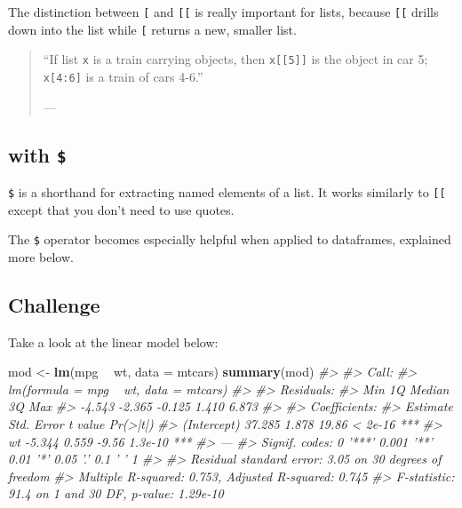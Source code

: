 \documentclass[]{book}
\newenvironment{Shaded}{\begin{snugshade}}{\end{snugshade}}
\newcommand{\CommentTok}[1]{\textcolor[rgb]{0.56,0.35,0.01}{\textit{#1}}}
\newcommand{\DataTypeTok}[1]{\textcolor[rgb]{0.13,0.29,0.53}{#1}}
\newcommand{\KeywordTok}[1]{\textcolor[rgb]{0.13,0.29,0.53}{\textbf{#1}}}
\newcommand{\NormalTok}[1]{#1}
\newcommand{\OperatorTok}[1]{\textcolor[rgb]{0.81,0.36,0.00}{\textbf{#1}}}
\newcommand{\StringTok}[1]{\textcolor[rgb]{0.31,0.60,0.02}{#1}}
\begin{document}
The distinction between \texttt{{[}} and \texttt{{[}{[}} is really important for lists, because \texttt{{[}{[}} drills down into the list while \texttt{{[}} returns a new, smaller list.

\begin{quote}
``If list \texttt{x} is a train carrying objects, then \texttt{x{[}{[}5{]}{]}} is
the object in car 5; \texttt{x{[}4:6{]}} is a train of cars 4-6.''

--- \citet{RLangTip}
\end{quote}

\hypertarget{with-2}{%
\subsection{\texorpdfstring{with \texttt{\$}}{with \$}}\label{with-2}}

\texttt{\$} is a shorthand for extracting named elements of a list. It works similarly to \texttt{{[}{[}} except that you don't need to use quotes.

\begin{Shaded}
\end{Shaded}

The \texttt{\$} operator becomes especially helpful when applied to dataframes, explained more below.

\hypertarget{challenge-2}{%
\subsection{Challenge}\label{challenge-2}}

Take a look at the linear model below:

\begin{Shaded}
\begin{Highlighting}[]
\NormalTok{mod <-}\StringTok{ }\KeywordTok{lm}\NormalTok{(mpg }\OperatorTok{~}\StringTok{ }\NormalTok{wt, }\DataTypeTok{data =}\NormalTok{ mtcars)}
\KeywordTok{summary}\NormalTok{(mod)}
\CommentTok{#> }
\CommentTok{#> Call:}
\CommentTok{#> lm(formula = mpg ~ wt, data = mtcars)}
\CommentTok{#> }
\CommentTok{#> Residuals:}
\CommentTok{#>    Min     1Q Median     3Q    Max }
\CommentTok{#> -4.543 -2.365 -0.125  1.410  6.873 }
\CommentTok{#> }
\CommentTok{#> Coefficients:}
\CommentTok{#>             Estimate Std. Error t value Pr(>|t|)    }
\CommentTok{#> (Intercept)   37.285      1.878   19.86  < 2e-16 ***}
\CommentTok{#> wt            -5.344      0.559   -9.56  1.3e-10 ***}
\CommentTok{#> ---}
\CommentTok{#> Signif. codes:  0 '***' 0.001 '**' 0.01 '*' 0.05 '.' 0.1 ' ' 1}
\CommentTok{#> }
\CommentTok{#> Residual standard error: 3.05 on 30 degrees of freedom}
\CommentTok{#> Multiple R-squared:  0.753,  Adjusted R-squared:  0.745 }
\CommentTok{#> F-statistic: 91.4 on 1 and 30 DF,  p-value: 1.29e-10}
\end{Highlighting}
\end{Shaded}
\end{document}
